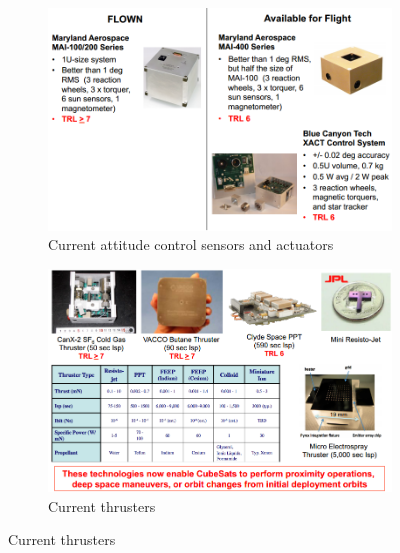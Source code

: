 \begin{figure}[!ht]
\begin{center}
\begin{figure}[!ht]
\includegraphics[scale=0.8]{attitude_control.png}
\caption{Current attitude control sensors and actuators}
\end{figure}
\newpage
\begin{figure}[!ht]
\includegraphics[scale=0.7]{prop_available.png}
\caption{Current thrusters}
\end{figure}
\end{center}


\end{figure}
